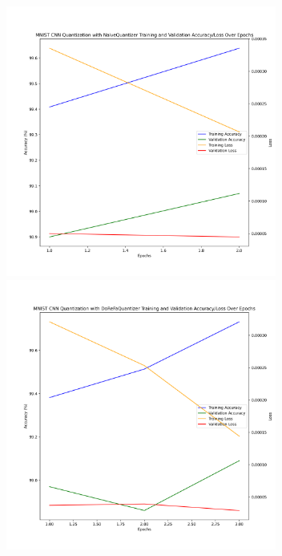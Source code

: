 \documentclass{article}
\begin{document}
\begin{figure}
    \centerline{\includegraphics[width=3.5in]{../proj2/figures/mnist_cnn_NaiveQuantizer_linear.png}\includegraphics[width=3.5in]{../proj2/figures/mnist_cnn_DoReFaQuantizer_linear.png}}

\end{figure}
\end{document}
